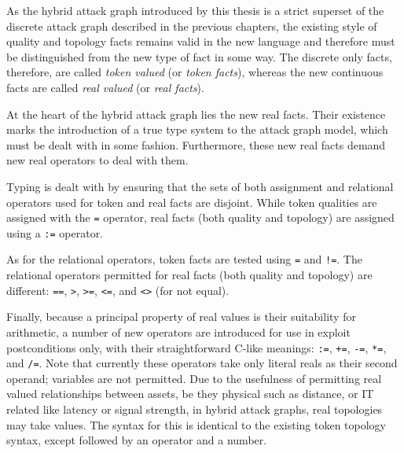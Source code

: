 As the hybrid attack graph introduced by this thesis is a strict superset
of the discrete attack graph described in the previous chapters, the existing style
of quality and topology facts remains valid in the new language and therefore
must be distinguished from the new type of fact in some way. The discrete
only facts, therefore, are called \emph{token valued} (or \emph{token facts}),
whereas the new continuous facts are called \emph{real valued} (or \emph{real
facts}).

At the heart of the hybrid attack graph lies the new real facts. Their
existence marks the introduction of a true type system to the attack graph
model, which must be dealt with in some fashion. Furthermore, these new real 
facts demand new real operators to deal with them.

Typing is dealt with by ensuring that the sets of both assignment and relational
operators used for token and real facts are disjoint. While token qualities are
assigned with the \texttt{=} operator, real facts (both quality and topology)
are assigned using a \texttt{:=} operator.

As for the relational operators, token facts are tested using \texttt{=} 
and \texttt{!=}. The relational operators permitted for real facts (both
quality and topology) are different: \texttt{==}, \texttt{>}, \texttt{>=},
\texttt{<=}, and \texttt{<>} (for not equal).

Finally, because a principal property of real values is their suitability for
arithmetic, a number of new operators are introduced for use in exploit
postconditions only, with their straightforward C-like meanings: \texttt{:=},
\texttt{+=}, \texttt{-=}, \texttt{*=}, and \texttt{/=}. Note that currently
these operators take only literal reals as their second operand; variables
are not permitted.
Due to the usefulness of permitting real valued relationships between assets,
be they physical such as distance, or IT related like latency or signal
strength, in hybrid attack graphs, real topologies may take values. The
syntax for this is identical to the existing token topology syntax, except
followed by an operator and a number.

